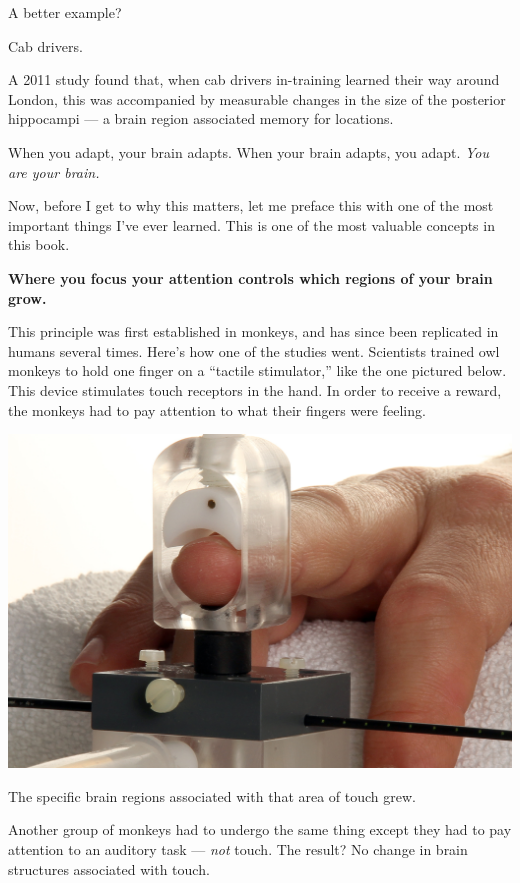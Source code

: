A better example?

Cab drivers.

A 2011 study found that, when cab drivers in-training learned their way around
London, this was accompanied by measurable changes in the size of the posterior
hippocampi --- a brain region associated memory for locations. \cite{woollett2011acquiring}

When you adapt, your brain adapts. When your brain adapts, you adapt. \textit{You are
your brain.}

Now, before I get to why this matters, let me preface this with one of the most
important things I've ever learned. This is one of the most valuable concepts in this
book. 

\textbf{Where you focus your attention controls which regions of your brain
  grow.}

This principle was first established in monkeys, and has since been replicated
in humans several times.\cite{heron2010attention}\cite{stefan2004modulation} Here's how one of the studies\cite{recanzone1992topographic} went. Scientists trained owl
monkeys to hold one finger on a ``tactile stimulator,'' like the one pictured below. This
device stimulates touch receptors in the hand. In order to receive a reward, the monkeys
had to pay attention to what their fingers were feeling.

\includegraphics[width=\textwidth]{graphics/tactile-simulator.jpg}

The specific brain regions associated with that area of touch grew.

Another group of monkeys had to undergo the same thing except they had to
pay attention to an auditory task --- \textit{not} touch. The result? No change in brain structures
associated with touch.

